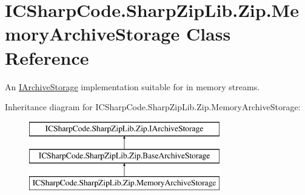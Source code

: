 \hypertarget{class_i_c_sharp_code_1_1_sharp_zip_lib_1_1_zip_1_1_memory_archive_storage}{}\section{I\+C\+Sharp\+Code.\+Sharp\+Zip\+Lib.\+Zip.\+Memory\+Archive\+Storage Class Reference}
\label{class_i_c_sharp_code_1_1_sharp_zip_lib_1_1_zip_1_1_memory_archive_storage}


An \hyperlink{interface_i_c_sharp_code_1_1_sharp_zip_lib_1_1_zip_1_1_i_archive_storage}{I\+Archive\+Storage} implementation suitable for in memory streams.  


Inheritance diagram for I\+C\+Sharp\+Code.\+Sharp\+Zip\+Lib.\+Zip.\+Memory\+Archive\+Storage\+:\begin{figure}[H]
\begin{center}
\leavevmode
\includegraphics[height=3.000000cm]{class_i_c_sharp_code_1_1_sharp_zip_lib_1_1_zip_1_1_memory_archive_storage}
\end{center}
\end{figure}
